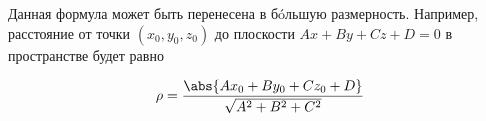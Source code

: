 \begin{remark}
  Данная формула может быть перенесена в б\'oльшую размерность. Например,
  расстояние от точки \((x_0, y_0, z_0)\) до плоскости \(A x + B y + C z + D =
  0\) в пространстве будет равно

  \begin{equation*}
    \rho = \frac{\abs{A x_0 + B y_0 + C z_0 + D}}{\sqrt{A^2 + B^2 + C^2}}
  \end{equation*}
\end{remark} 

